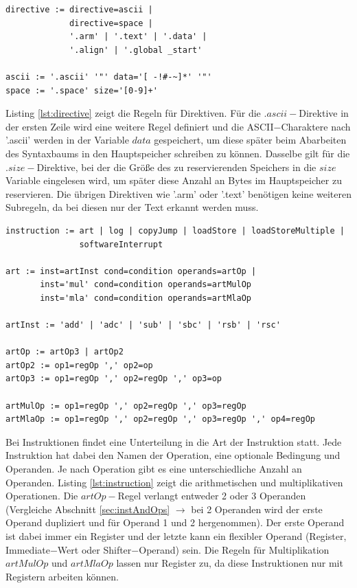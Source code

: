 \documentclass[a4paper, 11pt, onecolumn]{article}
\begin{document}
\begin{lstlisting}[basicstyle=\ttfamily\footnotesize, backgroundcolor=\color{backcolour}, caption={Direktiven}, captionpos=b, label={lst:directive}]
directive := directive=ascii |
             directive=space |
             '.arm' | '.text' | '.data' |
             '.align' | '.global _start'

ascii := '.ascii' '"' data='[ -!#-~]*' '"'
space := '.space' size='[0-9]+'
\end{lstlisting}

Listing \ref{lst:directive} zeigt die Regeln für Direktiven. Für die $.ascii-$Direktive in der ersten Zeile wird eine weitere Regel definiert und die ASCII$-$Charaktere nach '.ascii' werden in der Variable $data$ gespeichert, um diese später beim Abarbeiten des Syntaxbaums in den Hauptspeicher schreiben zu können. Dasselbe gilt für die $.size-$Direktive, bei der die Größe des zu reservierenden Speichers in die $size$ Variable eingelesen wird, um später diese Anzahl an Bytes im Hauptspeicher zu reservieren. Die übrigen Direktiven wie '.arm' oder '.text' benötigen keine weiteren Subregeln, da bei diesen nur der Text erkannt werden muss.\\

\begin{lstlisting}[basicstyle=\ttfamily\footnotesize, backgroundcolor=\color{backcolour}, caption={Instruktionen}, captionpos=b, label={lst:instruction}]
instruction := art | log | copyJump | loadStore | loadStoreMultiple |
               softwareInterrupt
               
art := inst=artInst cond=condition operands=artOp |
       inst='mul' cond=condition operands=artMulOp
       inst='mla' cond=condition operands=artMlaOp

artInst := 'add' | 'adc' | 'sub' | 'sbc' | 'rsb' | 'rsc'

artOp := artOp3 | artOp2
artOp2 := op1=regOp ',' op2=op
artOp3 := op1=regOp ',' op2=regOp ',' op3=op

artMulOp := op1=regOp ',' op2=regOp ',' op3=regOp
artMlaOp := op1=regOp ',' op2=regOp ',' op3=regOp ',' op4=regOp
\end{lstlisting}

Bei Instruktionen findet eine Unterteilung in die Art der Instruktion statt. Jede Instruktion hat dabei den Namen der Operation, eine optionale Bedingung und Operanden. Je nach Operation gibt es eine unterschiedliche Anzahl an Operanden. Listing \ref{lst:instruction} zeigt die arithmetischen und multiplikativen Operationen. Die $artOp-$Regel verlangt entweder 2 oder 3 Operanden (Vergleiche Abschnitt \ref{sec:instAndOps} $\rightarrow$ bei 2 Operanden wird der erste Operand dupliziert und für Operand 1 und 2 hergenommen). Der erste Operand ist dabei immer ein Register und der letzte kann ein flexibler Operand (Register, Immediate$-$Wert oder Shifter$-$Operand) sein. Die Regeln für Multiplikation $artMulOp$ und $artMlaOp$ lassen nur Register zu, da diese Instruktionen nur mit Registern arbeiten können.\\
\end{document}
